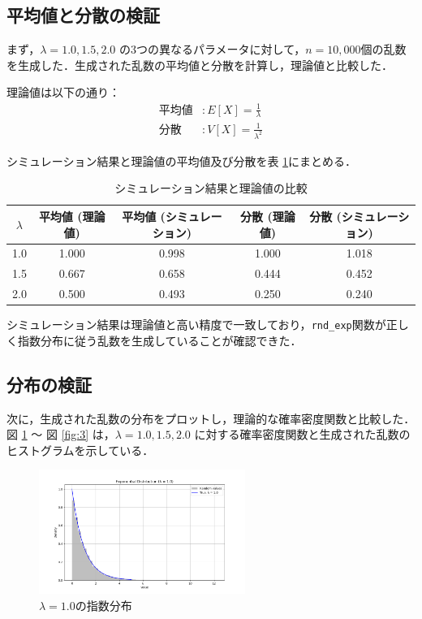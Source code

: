 \documentclass[fleqn, a4paper. 12pt]{jsarticle}
\begin{document}
    \subsection*{平均値と分散の検証}
    まず，$\lambda = 1.0, 1.5, 2.0$ の3つの異なるパラメータに対して，$n = 10,000$個の乱数を生成した．生成された乱数の平均値と分散を計算し，理論値と比較した．

    理論値は以下の通り：
    \begin{align*}
        \text{平均値} & : E[X] = \frac{1}{\lambda} \\
        \text{分散} & : V[X] = \frac{1}{\lambda^2}
    \end{align*}

    \quad

    シミュレーション結果と理論値の平均値及び分散を表 \ref{table:1}にまとめる．

    \begin{table}[h]
      \centering
      \caption{シミュレーション結果と理論値の比較}
      \begin{tabular}{|c|c|c|c|c|}
      \hline
      $\lambda$ & 平均値 (理論値) & 平均値 (シミュレーション) & 分散 (理論値) & 分散 (シミュレーション) \\
      \hline
      1.0 & 1.000 & 0.998 & 1.000 & 1.018 \\
      1.5 & 0.667 & 0.658 & 0.444 & 0.452 \\
      2.0 & 0.500 & 0.493 & 0.250 & 0.240 \\
      \hline
      \end{tabular}
      \label{table:1}
    \end{table}

    シミュレーション結果は理論値と高い精度で一致しており，\texttt{rnd\_exp}関数が正しく指数分布に従う乱数を生成していることが確認できた．

    \subsection*{分布の検証}
    次に，生成された乱数の分布をプロットし，理論的な確率密度関数と比較した．図 \ref{fig:1} 〜 図 \ref{fig:3} は，$\lambda = 1.0, 1.5, 2.0$ に対する確率密度関数と生成された乱数のヒストグラムを示している．

    \begin{figure}[!h]
      \centering
      \includegraphics[width=0.6\textwidth]{lambda_1.0_plot.png}
      \caption{ $\lambda = 1.0$の指数分布}
      \label{fig:1}
    \end{figure}
\end{document}
